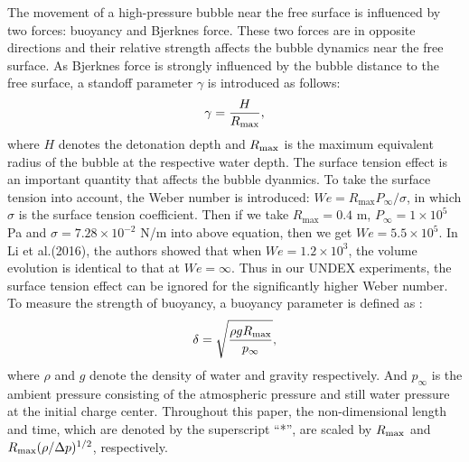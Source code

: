 \documentclass[%
 aip,
 amsmath,amssymb,
 reprint,%
]{revtex4-1}
\begin{document}
{The movement of a high-pressure bubble near the free surface is influenced by two forces: buoyancy and Bjerknes force. These two forces are in opposite directions and their relative strength affects the bubble dynamics near the free surface. As Bjerknes force is strongly influenced by the bubble distance to the free surface, a standoff parameter $\gamma$ is introduced as follows:
\begin{equation}
\label{eq:standoff}
\gamma=\frac{H}{R_{\rm{max}}},
\end{equation}
where $H$ denotes the detonation depth and $R_{\rm{max}}$ is the maximum equivalent radius of the bubble at the respective water depth. { The surface tension effect is an important quantity that affects the bubble dyanmics\cite{WOS:000521052700001,WOS:000807121500001}. To take the surface tension into account, the Weber number is introduced\cite{RN3037}: $We=R_{\text{max}} P_{\infty}/\sigma$, in which $\sigma$ is the surface tension coefficient. Then if we take $R_{\text{max}}=0.4$ m,  $P_{\infty}=1\times 10^5$ Pa and $\sigma=7.28\times 10^{-2}$ N/m into above equation, then we get $We=5.5\times 10^5$. In Li et al.\cite{RN3037}(2016), the authors showed that when $We=1.2\times10^3$, the volume evolution is identical to that at  $We=\infty$. Thus in our UNDEX experiments, the surface tension effect can be ignored for the significantly higher Weber number.} To measure the strength of buoyancy, a buoyancy parameter \citep{RN2495} is defined as :
\begin{equation}
\label{eq:buoyancy parameter}
\delta=\sqrt{\frac{\rho g R_{\rm{max}}}{p_{\infty}}} ,
\end{equation}
where $\rho$ and $g$ denote the density of water and gravity respectively. And $p_{\infty}$ is the ambient pressure consisting of the atmospheric pressure and still water pressure at the initial charge center. Throughout this paper, the non-dimensional length and time, which are denoted by the superscript ``*'', are scaled by $R_{\rm{max}}$ and $R_{\rm{max}}(\rho/\Delta p)^{1/2}$, respectively.
}
\end{document}
